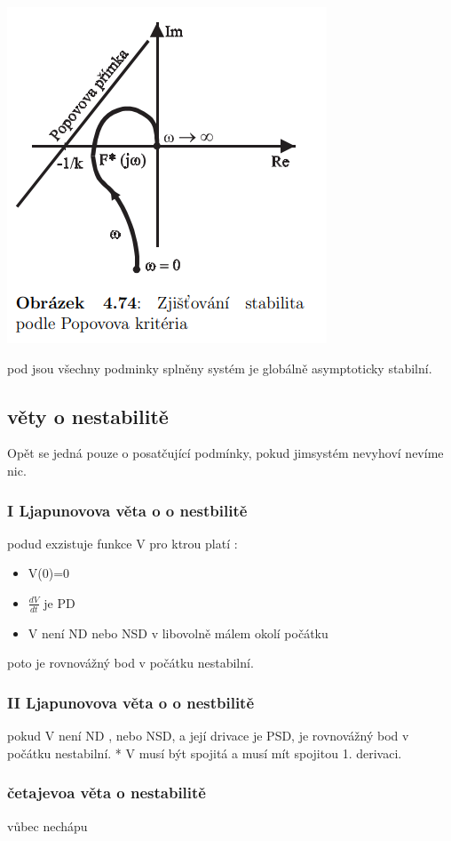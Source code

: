 \begin{itemize}
        \includegraphics{img/popov_frek.png}
\end{itemize}
pod jsou všechny podminky splněny systém je globálně asymptoticky stabilní.


\subsection{věty o nestabilitě}
Opět se jedná pouze o posatčující podmínky, pokud jimsystém nevyhoví nevíme nic.

\subsubsection{I Ljapunovova věta o o nestbilitě}
podud exzistuje funkce V pro ktrou platí :
\begin{itemize}
    \item V(0)=0
    \item $\frac{dV}{dt}$ je PD
    \item V není ND nebo NSD v libovolně málem okolí počátku
\end{itemize}
poto je rovnovážný bod v počátku nestabilní.


\subsubsection{II Ljapunovova věta o o nestbilitě}
pokud V není ND , nebo NSD, a její drivace je PSD, je rovnovážný bod v počátku nestabilní.
* V musí být spojitá a musí mít spojitou 1. derivaci.
\subsubsection{četajevoa věta o nestabilitě}
vůbec nechápu

